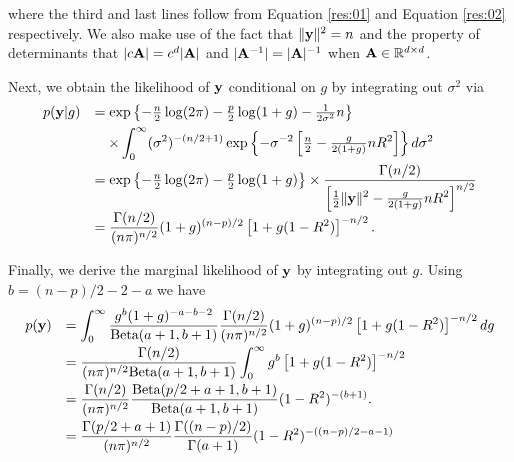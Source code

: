 \noindent where the third and last lines follow from
Equation \ref{res:01} and Equation \ref{res:02} respectively.
We also make use of the fact that $\|{\bf y}\|^2 = n$ and the property of determinants that $|c{\bf A}| = c^d|{\bf A}|$ and $|{\bf A}^{-1}| = |{\bf A}|^{-1}$ when ${\bf A} \in{\mathbb R}^{d\times d}$.


Next, we obtain the likelihood of ${\bf y}$ conditional on $g$ by integrating out $\sigma^2$ via
$$
\begin{array}{rl}
	\displaystyle p({\bf y}|g) 
	  & \displaystyle = \exp\left\{
	- \tfrac{n}{2}\log(2\pi) - \tfrac{p}{2}\log(1+g) 
	- \tfrac{1}{2\sigma^2}n
	\right\}
	\\ [1ex]
	  & \displaystyle \quad \times                                                                                 
	\int_0^\infty (\sigma^2)^{-(n/2 + 1)}
	\exp\left\{
	- \sigma^{-2} \left[ \tfrac{n}{2} - \tfrac{g}{2(1+g)} nR^2 \right] 
	\right\} d\sigma^2
	\\ [2ex]
	  & \displaystyle = \exp\left\{                                                                                 
	- \tfrac{n}{2}\log(2\pi) - \tfrac{p}{2}\log(1+g)
	\right\}
	\times 
	\frac{\Gamma(n/2)}{\displaystyle \left[ \tfrac{1}{2}\|{\bf y}\|^2 - \tfrac{g}{2(1+g)}nR^2 \right] ^{n/2}}
	\\ [2ex]
	  & \displaystyle = \frac{\Gamma(n/2)}{(n\pi)^{n/2}} (1 + g)^{(n-p)/2} \left[  1 + g(1 -  R^2) \right] ^{-n/2}. 
\end{array}
$$

\noindent Finally, we derive the marginal likelihood of ${\bf y}$ by integrating out $g$. Using $b= (n-p)/2 - 2 - a$ we have
$$
\begin{array}{rl}
	\displaystyle p({\bf y}) 
	  & \displaystyle = \int_0^\infty                                         
	\frac{g^{b}(1 + g)^{-a-b-2}}{\mbox{Beta}(a+1,b+1)}
	\frac{\Gamma(n/2)}{(n\pi)^{n/2}} (1 + g)^{(n-p)/2} \left[  1 + g(1 -  R^2) \right]^{-n/2}
	dg
	\\ [2ex]
	  & \displaystyle = \frac{\Gamma(n/2)}{(n\pi)^{n/2} \mbox{Beta}(a+1,b+1)} 
	\int_0^\infty g^{b} \left[  1 + g(1 -  R^2) \right]^{-n/2}
	\\ [2ex]
	  & \displaystyle = \frac{\Gamma(n/2) }{(n\pi)^{n/2}}                     
	\frac{\mbox{Beta}( p/2 + a + 1,b+1)}{\mbox{Beta}(a+1,b+1)}
	(1 -  R^2)^{-(b+1)}.
	\\ [2ex]
	  & \displaystyle                                                         
	= \frac{\Gamma( p/2 + a + 1)}{(n\pi)^{n/2}} 
	\frac{\Gamma((n-p)/2)}{\Gamma(a+1)} (1 -  R^2)^{-((n-p)/2 - a - 1)} \\
\end{array}
$$

